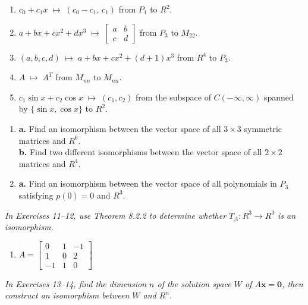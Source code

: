 \documentclass{article}
\begin{document}
\begin{enumerate}
  \item $c_0 + c_1 x \;\longmapsto\; (c_0 - c_1,\, c_1)$ from $P_1$ to $R^2$.

  \item[3.] $a + bx + cx^2 + dx^3 \;\longmapsto\; \begin{bmatrix}a&b\\c&d\end{bmatrix}$
        from $P_3$ to $M_{22}$.

  \item[5.] $(a,b,c,d) \;\longmapsto\; a + bx + cx^2 + (d+1)x^3$ from $R^4$ to $P_3$.

  \item[6.] $A \;\longmapsto\; A^T$ from $M_{nn}$ to $M_{nn}$.

  \item[7.] $c_1\sin x + c_2\cos x \;\longmapsto\; (c_1, c_2)$ from the subspace of
        $C(-\infty,\infty)$ spanned by $\{\sin x, \cos x\}$ to $R^2$.

\end{enumerate}

\begin{enumerate}
  \item[9.] \textbf{a.} Find an isomorphism between the vector space of all $3\times 3$
        symmetric matrices and $R^6$.\\
        \textbf{b.} Find two different isomorphisms between the vector space of all
        $2\times 2$ matrices and $R^4$.

  \item[10.] \textbf{a.} Find an isomorphism between the vector space of all polynomials
        in $P_3$ satisfying $p(0) = 0$ and $R^3$.

\end{enumerate}

\noindent\textit{In Exercises 11--12, use Theorem 8.2.2 to determine whether
$T_A : R^3 \to R^3$ is an isomorphism.}

\begin{enumerate}
  \item[11.] $A = \begin{bmatrix}0&1&-1\\1&0&2\\-1&1&0\end{bmatrix}$

\end{enumerate}

\noindent\textit{In Exercises 13--14, find the dimension $n$ of the solution space $W$
of $A\mathbf{x} = \mathbf{0}$, then construct an isomorphism between $W$ and $R^n$.}
\end{document}
